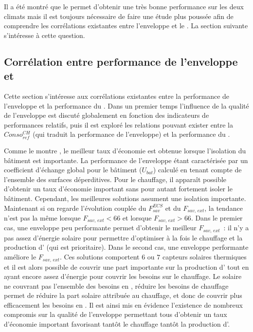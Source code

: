 Il a été montré que le  permet d’obtenir une très bonne performance sur les deux
climats mais il est toujours nécessaire de faire une étude plus poussée afin de comprendre
les corrélations existantes entre l’enveloppe et le . La section suivante
s’intéresse à cette question.



\subsection{Corrélation entre performance de l’enveloppe et } %
\label{sub:correlation_entre_performance_de_l_enveloppe_et_ssc}
Cette section s’intéresse aux corrélations existantes entre la performance de l’enveloppe
et la performance du . Dans un premier temps l’influence de la qualité de
l’enveloppe est discuté globalement en fonction des indicateurs de performances relatifs,
puis il est exploré les relations pouvant exister entre la $Conso_{ref}^{CH}$ (qui traduit
la performance de l’enveloppe) et la performance du .

Comme le montre , le meilleur taux d’économie est
obtenue lorsque l’isolation du bâtiment est importante. La performance de l’enveloppe
étant caractérisée par un coefficient d’échange global pour le bâtiment ($U_{bat}$) calculé
en tenant compte de l’ensemble des surfaces déperditives. Pour le chauffage, il apparaît
possible d’obtenir un taux d’économie important sans pour autant fortement isoler le
bâtiment. Cependant, les meilleures solutions assument une isolation importante.
Maintenant si on regarde l’évolution couplée du $F_{sav}^{ECS}$ et du $F_{sav,\, ext}$, la
tendance n’est pas la même lorsque $F_{sav,\, ext} < 66$ et lorsque $F_{sav,\, ext} > 66$.
Dans le premier cas, une enveloppe peu performante permet d’obtenir le meilleur $F_{sav,\,ext}$~:
il n’y a pas assez d’énergie solaire pour permettre d’optimiser à la fois le
chauffage et la production d’ (qui est prioritaire). Dans le second cas, une
enveloppe performante améliore le $F_{sav,\, ext}$. Ces solutions comportent $6$ ou $7$
capteurs solaires thermiques et il est alors possible de couvrir une part importante sur
la production d’ tout en ayant encore assez d’énergie pour couvrir les besoins sur
le chauffage. Le solaire ne couvrant pas l’ensemble des besoins en
, réduire les besoins de chauffage permet de réduire la part solaire attribuée au
chauffage, et donc de couvrir plus efficacement les besoins en .
Il est ainsi mis en évidence l’existence de nombreux compromis sur la qualité de l’enveloppe
permettant tous d’obtenir un taux d’économie important favorisant tantôt le chauffage
tantôt la production d’.

